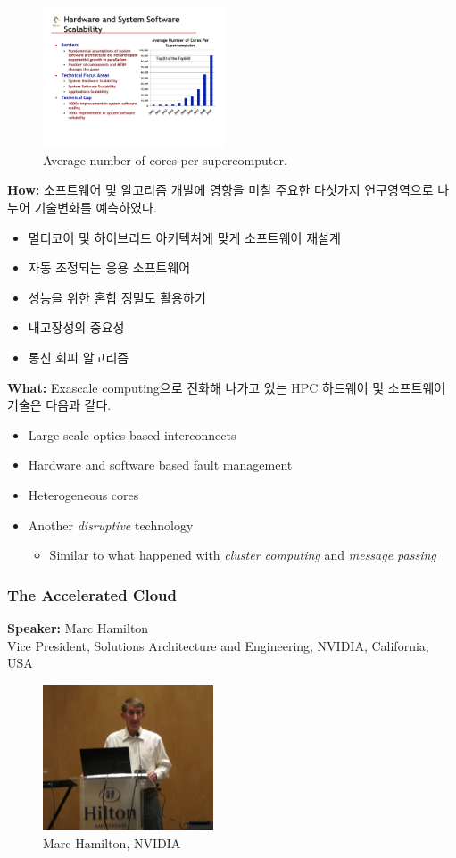 \documentclass[twocolumn]{article}
\newcommand{\bi}{\begin{itemize}}
\newcommand{\ei}{\end{itemize}}
\newcommand{\ii}{\item}
\begin{document}
\begin{figure}[htb]
        \centering
        \includegraphics[width=0.48\textwidth]{hpc_cores.pdf}
        \caption{Average number of cores per supercomputer.}
        \label{fig:hpc_cores}
\end{figure}

\noindent
\textbf{How:}  소프트웨어 및 알고리즘 개발에 영향을 미칠 주요한 다섯가지 연구영역으로 나누어 기술변화를 예측하였다.
\bi
\ii 멀티코어 및 하이브리드 아키텍쳐에 맞게 소프트웨어 재설계 
\ii 자동 조정되는 응용 소프트웨어
\ii  성능을 위한 혼합 정밀도 활용하기
\ii 내고장성의 중요성
\ii 통신 회피 알고리즘
\ei

\noindent
\textbf{What:} Exascale computing으로 진화해 나가고 있는 HPC 하드웨어 및 소프트웨어 기술은 다음과 같다.
\bi
\ii Large-scale optics based interconnects
\ii Hardware and software based fault management
\ii Heterogeneous cores
\ii Another \textit{disruptive} technology
\bi
\ii Similar to what happened with \textit{cluster computing} and \textit{message passing}
\ei
\ei

\subsubsection{The Accelerated Cloud}
\textbf{Speaker:} Marc Hamilton\\
Vice President, Solutions Architecture and Engineering, NVIDIA, California, USA
\begin{figure}[htb]
        \centering
        \includegraphics[width=0.45\textwidth]{marc.png}
        \caption{Marc Hamilton, NVIDIA}
        \label{fig:marc}
\end{figure}
\end{document}
